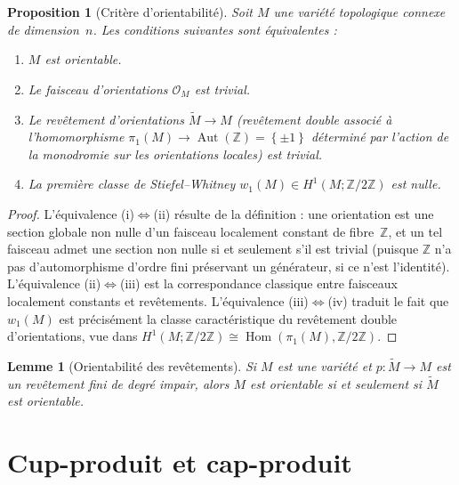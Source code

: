 \documentclass[12pt,a4paper,openany]{book}
\theoremstyle{definition}
\theoremstyle{plain}
\newtheorem{proposition}[definition]{Proposition}
\newtheorem{lemme}[definition]{Lemme}
\theoremstyle{remark}
\newcommand{\Z}{\mathbb{Z}}
\DeclareMathOperator{\Hom}{Hom}
\DeclareMathOperator{\Aut}{Aut}
\newcommand{\set}[1]{\left\{#1\right\}}
\begin{document}
\begin{proposition}[Critère d'orientabilité]\label{prop:critere-orientabilite}
  Soit $M$ une variété topologique connexe de dimension~$n$. Les conditions suivantes
  sont équivalentes :
  \begin{enumerate}[label=(\roman*)]
    \item $M$ est orientable.
    \item Le faisceau d'orientations $\mathcal{O}_M$ est trivial.
    \item Le revêtement d'orientations $\widetilde{M} \to M$ (revêtement double
          associé à l'homomorphisme $\pi_1(M) \to \Aut(\Z) = \set{\pm 1}$
          déterminé par l'action de la monodromie sur les orientations locales)
          est trivial.
    \item La première classe de Stiefel--Whitney $w_1(M) \in H^1(M; \Z/2\Z)$
          est nulle.
  \end{enumerate}
\end{proposition}

\begin{proof}
  L'équivalence (i)$\Leftrightarrow$(ii) résulte de la définition : une orientation
  est une section globale non nulle d'un faisceau localement constant de fibre~$\Z$,
  et un tel faisceau admet une section non nulle si et seulement s'il est trivial
  (puisque $\Z$ n'a pas d'automorphisme d'ordre fini préservant un générateur, si ce
  n'est l'identité). L'équivalence (ii)$\Leftrightarrow$(iii) est la correspondance
  classique entre faisceaux localement constants et revêtements. L'équivalence
  (iii)$\Leftrightarrow$(iv) traduit le fait que $w_1(M)$ est précisément la classe
  caractéristique du revêtement double d'orientations, vue dans
  $H^1(M; \Z/2\Z) \cong \Hom(\pi_1(M), \Z/2\Z)$.
\end{proof}

\begin{lemme}[Orientabilité des revêtements]\label{lem:orientabilite-revetement}
  Si $M$ est une variété et $p \colon \widetilde{M} \to M$ est un revêtement fini
  de degré impair, alors $M$ est orientable si et seulement si $\widetilde{M}$ est
  orientable.
\end{lemme}


\section{Cup-produit et cap-produit}\label{sec:cap-produit}
\end{document}
